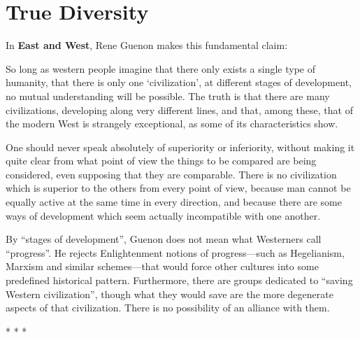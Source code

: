 \section{True Diversity}

In \textbf{East and West}, Rene Guenon makes this fundamental claim:

\begin{quotationx}
So long as western people imagine that there only exists a single type of humanity, that there is only one `civilization', at different stages of development, no mutual understanding will be possible. The truth is that there are many civilizations, developing along very different lines, and that, among these, that of the modern West is strangely exceptional, as some of its characteristics show.

One should never speak absolutely of superiority or inferiority, without making it quite clear from what point of view the things to be compared are being considered, even supposing that they are comparable. There is no civilization which is superior to the others from every point of view, because man cannot be equally active at the same time in every direction, and because there are some ways of development which seem actually incompatible with one another.
\end{quotationx}

By ``stages of development'', Guenon does not mean what Westerners call ``progress''. He rejects Enlightenment notions of progress---such as Hegelianism, Marxism and similar schemes---that would force other cultures into some predefined historical pattern. Furthermore, there are groups dedicated to ``saving Western civilization'', though what they would save are the more degenerate aspects of that civilization. There is no possibility of an alliance with them.



\begin{center}* * *\end{center}

